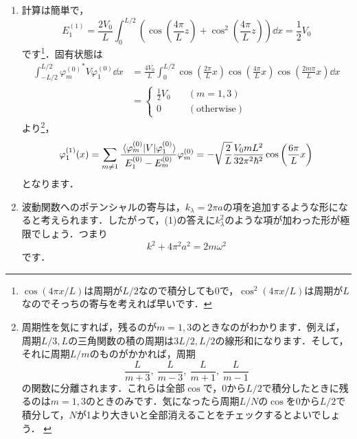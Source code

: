 \documentclass[a4paper,pdflatex,ja=standard]{bxjsarticle}
\begin{document}
\begin{enumerate}
  \item 
  計算は簡単で，
  \begin{equation}
    E_1^{(1)}
    =
    \frac{2V_0}{L}
    \int_0^{L/2}
    \left(  
      \cos\left( \frac{4\pi}{L}z \right)
      +
      \cos^2\left( \frac{4\pi}{L}z \right)
    \right)
    \dd x
    =
    \frac{1}{2}V_0
  \end{equation}
  です\footnote{
    $\cos(4\pi x/L)$は周期が$L/2$なので積分しても0で，$\cos^2(4\pi x/L)$は周期が$L$なのでそっちの寄与を考えれば早いです．
  }．固有状態は
  \begin{align}
    \int_{-L/2}^{L/2}
    {\varphi_m^{(0)}}^{*}
    V
    \varphi_1^{(0)}
    \dd x
    &=
    \frac{4V_0}{L}
    \int_{0}^{L/2}
    \cos\left( \frac{2\pi}{L}x \right)
    \cos\left( \frac{4\pi}{L}x \right)
    \cos\left( \frac{2m\pi}{L}x \right)
    \dd x
    \nonumber
    \\
    &=
    \left\{
      \begin{alignedat}{1}
        \frac{1}{2}V_0
        &
        \quad
        (m=1,3)
        \\
        0
        &
        \quad
        (\text{otherwise})
      \end{alignedat}
    \right.
  \end{align}
  より\footnote{
    周期性を気にすれば，残るのが$m=1,3$のときなのがわかります．例えば，周期$L/3,L$の三角関数の積の周期は$3L/2,L/2$の線形和になります．そして，それに周期$L/m$のものがかかれば，周期
    $$
      \frac{L}{m+3}
      ,\ 
      \frac{L}{m-3}
      ,\ 
      \frac{L}{m+1}
      ,\ 
      \frac{L}{m-1}
    $$
    の関数に分離されます．これらは全部$\cos$で，$0$から$L/2$で積分したときに残るのは$m=1,3$のときのみです．気になったら周期$L/N$の$\cos$を$0$から$L/2$で積分して，$N$が1より大きいと全部消えることをチェックするとよいでしょう．
    \label{note}
  }，
  \begin{equation}
    \varphi_1^{(1)}(x)
    =
    \sum_{m\neq 1}
    \frac{\ev*{\varphi_m^{(0)}|V|\varphi_1^{(0)}}}{E_1^{(0)}-E_m^{(0)}}
    \varphi_m^{(0)}
    =
    -\sqrt{\frac{2}{L}}
    \frac{V_0 mL^2}{32\pi^2\hbar^2}
    \cos\left( \frac{6\pi}{L}x \right)
  \end{equation}
  となります．

  \item 
  波動関数へのポテンシャルの寄与は，$k_\lambda=2\pi a$の項を追加するような形になると考えられます．したがって，(1)の答えに$k_\lambda^2$のような項が加わった形が極限でしょう．つまり
  \begin{equation}
    k^2+4\pi^2 a^2
    =
    2m\omega^2
  \end{equation}
  です．

\end{enumerate}
\end{document}
